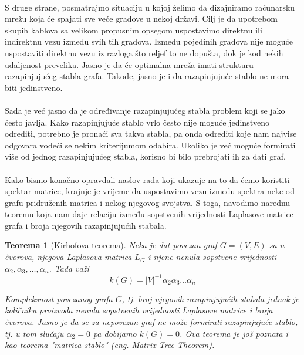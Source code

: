 \documentclass[11pt]{article}
\newtheorem{theorem}{Teorema}
\begin{document}
		\paragraph{}
	        S druge strane, posmatrajmo situaciju u kojoj želimo da dizajniramo računarsku mrežu koja će spajati sve veće gradove u nekoj državi. 
		Cilj je da upotrebom skupih kablova sa velikom propusnim opsegom uspostavimo direktnu ili indirektnu vezu između svih tih gradova.
		Između pojedinih gradova nije moguće uspostaviti direktnu vezu iz razloga što reljef to ne dopušta, dok je kod nekih udaljenost prevelika.
		Jasno je da će optimalna mreža imati strukturu razapinjujućeg stabla grafa. Takođe, jasno je i da razapinjujuće stablo ne mora biti jedinstveno.
	
		\paragraph{}
		Sada je već jasno da je određivanje razapinjujućeg stabla problem koji se jako često javlja. Kako razapinjujuće stablo vrlo često nije moguće jedinstveno odrediti, 
		potrebno je pronaći sva takva stabla, pa onda odrediti koje nam najvise odgovara vodeći se nekim kriterijumom odabira. 
		Ukoliko je već moguće formirati više od jednog razapinjujućeg stabla, korisno bi bilo prebrojati ih za dati graf.
		
		\paragraph{}
		Kako bismo konačno opravdali naslov rada koji ukazuje na to da ćemo koristiti spektar matrice,
		krajnje je vrijeme da uspostavimo vezu između spektra neke od grafu pridruženih 	     
		matrica i nekog njegovog svojstva. 
		S toga, navodimo narednu teoremu koja nam daje relaciju između sopstvenih vrijednosti Laplasove matrice grafa i broja njegovih razapinjujućih stabala.
	
		\begin{theorem}[Kirhofova teorema]
		Neka je dat povezan graf $G= (V,E) $ sa n čvorova, njegova Laplasova matrica $L_G$ i njene nenula sopstvene vrijednosti $\alpha_2, \alpha_3, \dots, \alpha_n$. Tada važi
		\[
			k(G) = |V|^{-1}\alpha_2 \alpha_3 \dots \alpha_n
		\]

		Kompleksnost povezanog grafa $G$, tj. broj njegovih razapinjujućih stabala jednak je količniku proizvoda nenula sopstvenih vrijednosti Laplasove matrice i broja čvorova. 
		Jasno je da se za nepovezan graf ne može formirati razapinjujuće stablo, tj. u tom slučaju $\alpha_2 = 0$ pa dobijamo $k(G) = 0$. 
		Ova teorema je još poznata i kao teorema "matrica-stablo" (eng. Matrix-Tree Theorem).
		\end{theorem}
	
\end{document}
